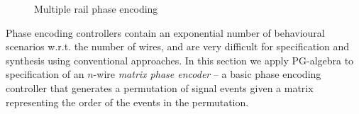 \begin{figure}
\begin{centering}
\hfill{}\hfill{}\hfill{}
\par\end{centering}

\caption{Multiple rail phase encoding\label{fig:phase-encoding}}
\vspace{-6mm}
\end{figure}


Phase encoding controllers contain an exponential number of behavioural
scenarios w.r.t. the number of wires, and are very difficult for specification
and synthesis using conventional approaches. In this section we apply
PG-algebra to specification of an $n$-wire \emph{matrix phase encoder}
-- a basic phase encoding controller that generates a permutation
of signal events given a matrix representing the order of the events
in the permutation.

